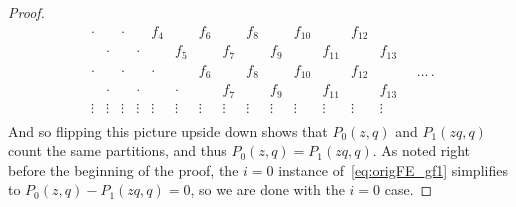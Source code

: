\documentclass[pdftex]{sigma}
\numberwithin{equation}{section}
\theoremstyle{definition}
\begin{document}
\begin{proof}
\begin{equation*}
\begin{matrix}
\cdot &&\cdot && f_4 && f_6 && f_8 && f_{10} && f_{12} & \\
& \cdot && \cdot && f_5 && f_7 && f_9 && f_{11} && f_{13}\\
\cdot && \cdot && \cdot && f_6 && f_8 && f_{10} && f_{12} & \\
& \cdot && \cdot && \cdot && f_7 && f_9 && f_{11} && f_{13}\\
\vdots & \vdots &\vdots& \vdots &\vdots& \vdots &\vdots& \vdots &\vdots& \vdots &\vdots& \vdots&\vdots& \vdots\\ \end{matrix}\quad\dots\,.
\end{equation*}
And so flipping this picture upside down shows that $P_0(z,q)$ and $P_1(zq,q)$ count the same partitions, and thus $P_0(z,q)=P_1(zq,q)$. As noted right before the beginning of the proof, the $i=0$ instance of~\eqref{eq:origFE_gf1} simplifies to $P_0(z,q)-P_1(zq,q)=0$, so we are done with the $i=0$ case.


\end{proof}
\end{document}
